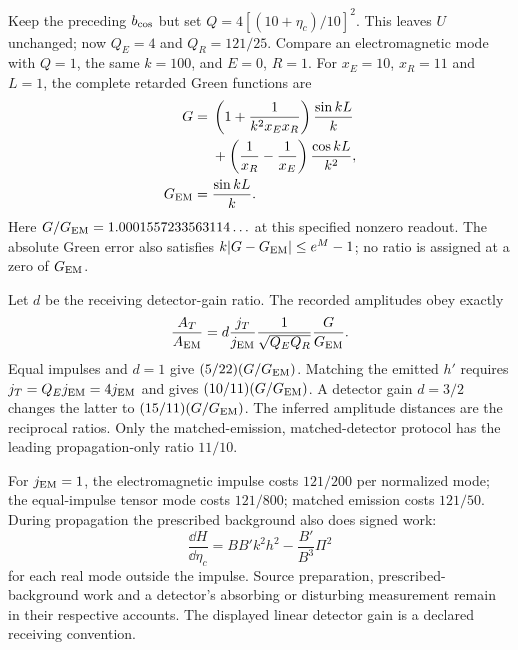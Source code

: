 Keep the preceding $b_{\rm cos}$ but set $Q=4[(10+\eta_c)/10]^2$. This leaves $U$ unchanged; now $Q_E=4$ and $Q_R=121/25$. Compare an electromagnetic mode with $Q=1$, the same $k=100$, and $E=0$, $R=1$. For $x_E=10$, $x_R=11$ and $L=1$, the complete retarded Green functions are
\[
\begin{split}
 G={}&\left(1+\frac1{k^2x_Ex_R}\right)\frac{\sin kL}{k}\\
 &+\left(\frac1{x_R}-\frac1{x_E}\right)\frac{\cos kL}{k^2},\\
 G_{\rm EM}={}&\frac{\sin kL}{k}.
\end{split}
\]
Here $G/G_{\rm EM}=1.0001557233563114\ldots$ at this specified nonzero readout. The absolute Green error also satisfies $k|G-G_{\rm EM}|\le e^M-1$; no ratio is assigned at a zero of $G_{\rm EM}$.

Let $d$ be the receiving detector-gain ratio. The recorded amplitudes obey exactly
\[
 \frac{A_T}{A_{\rm EM}}=
 d\frac{j_T}{j_{\rm EM}}\frac1{\sqrt{Q_EQ_R}}
 \frac{G}{G_{\rm EM}}.
\]
Equal impulses and $d=1$ give $(5/22)(G/G_{\rm EM})$. Matching the emitted $h'$ requires $j_T=Q_Ej_{\rm EM}=4j_{\rm EM}$ and gives $(10/11)(G/G_{\rm EM})$. A detector gain $d=3/2$ changes the latter to $(15/11)(G/G_{\rm EM})$. The inferred amplitude distances are the reciprocal ratios. Only the matched-emission, matched-detector protocol has the leading propagation-only ratio $11/10$.

For $j_{\rm EM}=1$, the electromagnetic impulse costs $121/200$ per normalized mode; the equal-impulse tensor mode costs $121/800$; matched emission costs $121/50$. During propagation the prescribed background also does signed work:
\[
 \frac{\dd H}{\dd\eta_c}
 =BB'k^2h^2-\frac{B'}{B^3}\Pi^2
\]
for each real mode outside the impulse. Source preparation, prescribed-background work and a detector's absorbing or disturbing measurement remain in their respective accounts. The displayed linear detector gain is a declared receiving convention.

